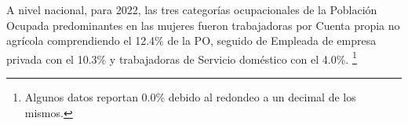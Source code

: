  A nivel nacional, para 2022, las tres categorías ocupacionales de la Población Ocupada predominantes en las mujeres fueron trabajadoras por Cuenta propia no agrícola comprendiendo el 12.4\% de la PO, seguido de Empleada de empresa privada con el 10.3\% y trabajadoras de Servicio doméstico con el 4.0\%. \footnote{Algunos datos reportan 0.0\% debido al redondeo a un decimal de los mismos.}
